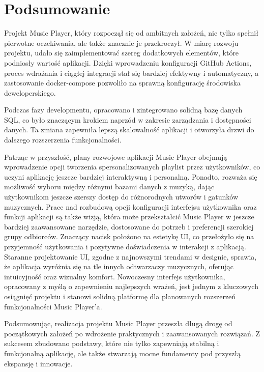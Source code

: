 ﻿%
\chapter{Podsumowanie}

Projekt Music Player, który rozpoczął się od ambitnych założeń, nie tylko spełnił pierwotne oczekiwania, ale także znacznie je przekroczył. W miarę rozwoju projektu, udało się zaimplementować szereg dodatkowych elementów, które podniosły wartość aplikacji. Dzięki wprowadzeniu konfiguracji GitHub Actions, proces wdrażania i ciągłej integracji stał się bardziej efektywny i automatyczny, a zastosowanie docker-compose pozwoliło na sprawną konfigurację środowiska deweloperskiego.

Podczas fazy developmentu, opracowano i zintegrowano solidną bazę danych SQL, co było znaczącym krokiem naprzód w zakresie zarządzania i dostępności danych. Ta zmiana zapewniła lepszą skalowalność aplikacji i otworzyła drzwi do dalszego rozszerzenia funkcjonalności.

Patrząc w przyszłość, plany rozwojowe aplikacji Music Player obejmują wprowadzenie opcji tworzenia spersonalizowanych playlist przez użytkowników, co uczyni aplikację jeszcze bardziej interaktywną i personalną. Ponadto, rozważa się możliwość wyboru między różnymi bazami danych z muzyką, dając użytkownikom jeszcze szerszy dostęp do różnorodnych utworów i gatunków muzycznych. Prace nad rozbudową opcji konfiguracji interfejsu użytkownika oraz funkcji aplikacji są także wizją, która może przekształcić Music Player w jeszcze bardziej zaawansowane narzędzie, dostosowane do potrzeb i preferencji szerokiej grupy odbiorców. Znaczący nacisk położono na estetykę UI, co przełożyło się na przyjemność użytkowania i pozytywne doświadczenia w interakcji z aplikacją. Staranne projektowanie UI, zgodne z najnowszymi trendami w designie, sprawia, że aplikacja wyróżnia się na tle innych odtwarzaczy muzycznych, oferując intuicyjność oraz wizualny komfort. Nowoczesny interfejs użytkownika, opracowany z myślą o zapewnieniu najlepszych wrażeń, jest jednym z kluczowych osiągnięć projektu i stanowi solidną platformę dla planowanych rozszerzeń funkcjonalności Music Player'a.

Podsumowując, realizacja projektu Music Player przeszła długą drogę od początkowych założeń po wdrożenie praktycznych i zaawansowanych rozwiązań. Z sukcesem zbudowano podstawy, które nie tylko zapewniają stabilną i funkcjonalną aplikację, ale także stwarzają mocne fundamenty pod przyszłą ekspansję i innowacje.




